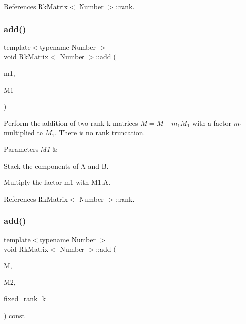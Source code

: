 References Rk\+Matrix$<$ Number $>$\+::rank.

\mbox{\label{classRkMatrix_a93b434797b9142a4dce0c6a64ba1e89c}} 
\subsubsection{\texorpdfstring{add()}{add()}\hspace{0.1cm}{\footnotesize\ttfamily [4/12]}}
{\footnotesize\ttfamily template$<$typename Number $>$ \\
void \hyperlink{classRkMatrix}{Rk\+Matrix}$<$ Number $>$\+::add (\begin{DoxyParamCaption}\item[{const Number}]{m1,  }\item[{const \hyperlink{classRkMatrix}{Rk\+Matrix}$<$ Number $>$ \&}]{M1 }\end{DoxyParamCaption})}

Perform the addition of two rank-\/k matrices $M = M + m_1 M_1$ with a factor $m_1$ multiplied to $M_1$. There is no rank truncation. 
\begin{DoxyParams}{Parameters}
{\em M1} & \\
\hline
\end{DoxyParams}
Stack the components of {\ttfamily A} and {\ttfamily B}.

Multiply the factor {\ttfamily m1} with {\ttfamily M1.\+A}.

References Rk\+Matrix$<$ Number $>$\+::rank.

\mbox{\label{classRkMatrix_ad8668d42978011b3e65d0381bfb068d5}} 
\subsubsection{\texorpdfstring{add()}{add()}\hspace{0.1cm}{\footnotesize\ttfamily [5/12]}}
{\footnotesize\ttfamily template$<$typename Number $>$ \\
void \hyperlink{classRkMatrix}{Rk\+Matrix}$<$ Number $>$\+::add (\begin{DoxyParamCaption}\item[{\hyperlink{classRkMatrix}{Rk\+Matrix}$<$ Number $>$ \&}]{M,  }\item[{const \hyperlink{classRkMatrix}{Rk\+Matrix}$<$ Number $>$ \&}]{M2,  }\item[{const \hyperlink{classRkMatrix_add060bfc3a4cc77f858c3d6dd58cadd5}{size\+\_\+type}}]{fixed\+\_\+rank\+\_\+k }\end{DoxyParamCaption}) const}

